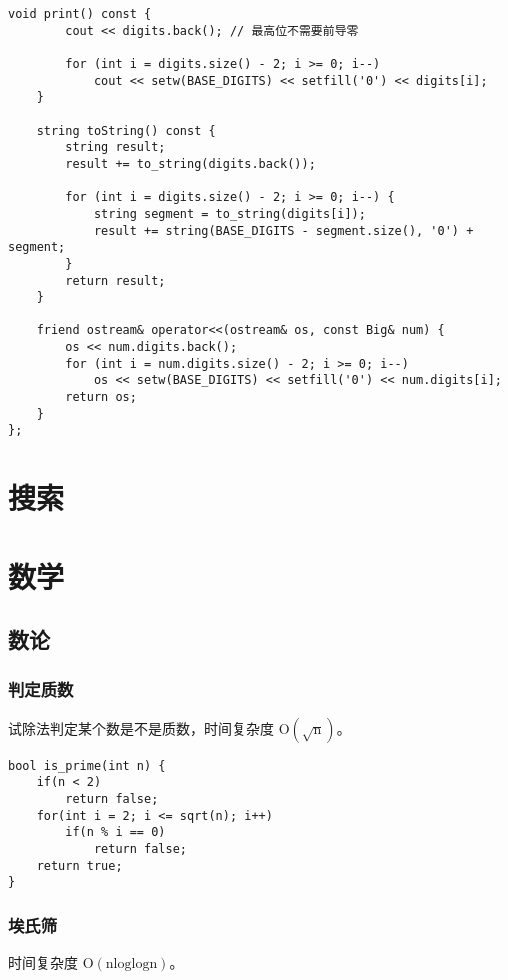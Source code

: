 \documentclass[UTF8]{article}
\begin{document}
\begin{lstlisting}[caption=压位高精度类]
    void print() const {
        cout << digits.back(); // 最高位不需要前导零
        
        for (int i = digits.size() - 2; i >= 0; i--) 
            cout << setw(BASE_DIGITS) << setfill('0') << digits[i];
    }
    
    string toString() const {
        string result;
        result += to_string(digits.back());
        
        for (int i = digits.size() - 2; i >= 0; i--) {
            string segment = to_string(digits[i]);
            result += string(BASE_DIGITS - segment.size(), '0') + segment;
        }
        return result;
    }
    
    friend ostream& operator<<(ostream& os, const Big& num) {
        os << num.digits.back();
        for (int i = num.digits.size() - 2; i >= 0; i--) 
            os << setw(BASE_DIGITS) << setfill('0') << num.digits[i];
        return os;
    }
};
\end{lstlisting}



\newpage %

\section{搜索}

\newpage
\section{数学}

\subsection{数论}

\subsubsection{判定质数}
试除法判定某个数是不是质数，时间复杂度 $\mathrm{O(\sqrt{n})}$。
\begin{lstlisting}[caption=判定素数]
bool is_prime(int n) {
    if(n < 2)
        return false;
    for(int i = 2; i <= sqrt(n); i++)
        if(n % i == 0)
            return false;
    return true;
}
\end{lstlisting}

\subsubsection{埃氏筛}
时间复杂度 $\mathrm{O(nloglogn)}$。
\end{document}
